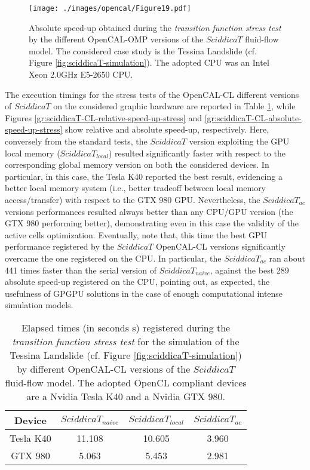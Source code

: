 \begin{figure}
	\begin{center}
		\texttt{[image: ./images/opencal/Figure19.pdf]}
		\caption{Absolute speed-up obtained during the \emph{transition function stress
				test} by the different OpenCAL-OMP versions of the $SciddicaT$
			fluid-flow model. The considered case study is the Tessina Landslide
			(cf. Figure \ref{fig:sciddicaT-simulation}). The adopted CPU was an
			Intel Xeon 2.0GHz E5-2650 CPU.}
		\label{gr:sciddicaT-OMP-absolute-speed-up-stress}
	\end{center}
\end{figure}


The execution timings for the stress tests of the OpenCAL-CL
different versions of $SciddicaT$ on the considered graphic
hardware are reported in Table
\ref{tab:sciddicaT-CL-execution-times}, while Figures
\ref{gr:sciddicaT-CL-relative-speed-up-stress} and
\ref{gr:sciddicaT-CL-absolute-speed-up-stress} show relative and
absolute speed-up, respectively. Here, conversely from the
standard tests, the $SciddicaT$ version exploiting the GPU local
memory ($SciddicaT_{local}$) resulted significantly faster with
respect to the corresponding global memory version on both the
considered devices. In particular, in this case, the Tesla K40
reported the best result, evidencing a better local memory system
(i.e., better tradeoff between local memory access/transfer) with
respect to the GTX 980 GPU. Nevertheless, the $SciddicaT_{ac}$
versions performances resulted always better than any CPU/GPU
version (the GTX 980 performing better), demonstrating even in
this case the validity of the active cells
optimization. Eventually, note that, this time the best GPU
performance registered by the $SciddicaT$ OpenCAL-CL versions
significantly overcame the one registered on the CPU. In
particular, the $SciddicaT_{ac}$ ran about 441 times faster than
the serial version of $SciddicaT_{naive}$, against the best 289
absolute speed-up registered on the CPU, pointing out, as
expected, the usefulness of GPGPU solutions in the case of enough
computational intense simulation models.
\begin{table}
	\centering
	\begin{tabular}{cccc}
		\hline Device & $SciddicaT_{naive}$ & $SciddicaT_{local}$ &
		$SciddicaT_{ac}$ \\ \hline Tesla K40 & 11.108 & 10.605 &
		3.960\\ GTX 980 & 5.063 & 5.453 & 2.981\\ \hline
	\end{tabular}
	\caption{Elapsed times (in seconds \si{s}) registered during the \emph{transition
			function stress test} for the simulation of the Tessina Landslide
		(cf. Figure \ref{fig:sciddicaT-simulation}) by different OpenCAL-CL
		versions of the $SciddicaT$ fluid-flow model. The adopted OpenCL
		compliant devices are a Nvidia Tesla K40 and a Nvidia GTX 980.}
	\label{tab:sciddicaT-CL-execution-times}
\end{table}
